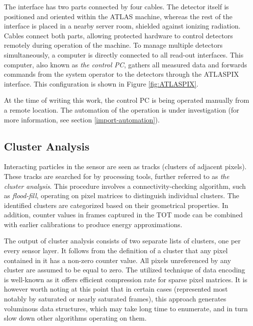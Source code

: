 
The interface has two parts connected by four cables. The detector itself is positioned and oriented within the ATLAS machine, whereas the rest of the interface is placed in a nearby server room, shielded against ionizing radiation. Cables connect both parts, allowing protected hardware to control detectors remotely during operation of the machine. To manage multiple detectors simultaneously, a computer is directly connected to all read-out interfaces. This computer, also known as \textit{the control PC}, gathers all measured data and forwards commands from the system operator to the detectors through the ATLASPIX interface. This configuration is shown in Figure \ref{fig:ATLASPIX}.

At the time of writing this work, the control PC is being operated manually from a remote location. The automation of the operation is under investigation (for more information, see section \ref{import-automation}).

\subsection{Cluster Analysis}
\label{intro:cluster-analysis}
Interacting particles in the sensor are seen as tracks (clusters of adjacent pixels). These tracks are searched for by processing tools, further referred to as \textit{the cluster analysis}. This procedure involves a connectivity-checking algorithm, such as \textit{flood-fill}, operating on pixel matrices to distinguish individual clusters. The identified clusters are categorized based on their geometrical properties. In addition, counter values in frames captured in the TOT mode can be combined with earlier calibrations to produce energy approximations. \cite{Jakubek2011S262}

\todo

The output of cluster analysis consists of two separate lists of clusters, one per every sensor layer. It follows from the definition of a cluster that any pixel contained in it has a non-zero counter value. All pixels unreferenced by any cluster are assumed to be equal to zero. The utilized technique of data encoding is well-known as it offers efficient compression rate for sparse pixel matrices. It is however worth noting at this point that in certain cases (represented most notably by saturated or nearly saturated frames), this approach generates voluminous data structures, which may take long time to enumerate, and in turn slow down other algorithms operating on them.

